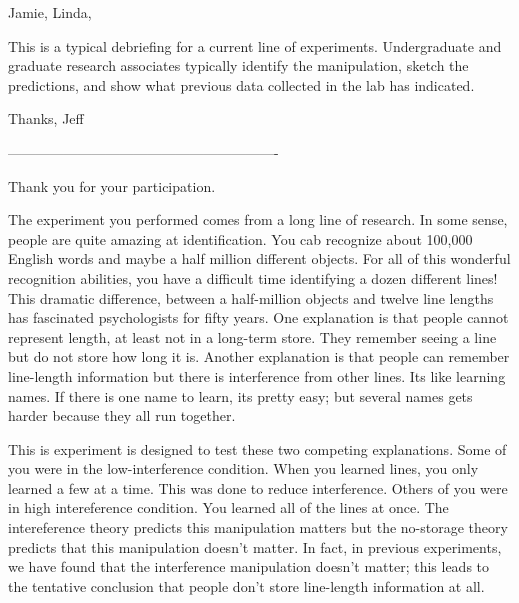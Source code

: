Jamie, Linda,

This is a typical debriefing for a current line of experiments.
Undergraduate and graduate research associates typically identify the
manipulation, sketch the predictions, and show what previous data
collected in the lab has indicated.  

Thanks,
Jeff

----------------------------------------------------------


Thank you for your participation.  

The experiment you performed comes from a long line of research.  In
some sense, people are quite amazing at identification.  You cab
recognize about 100,000 English words and maybe a half million
different objects.  For all of this wonderful recognition abilities,
you have a difficult time identifying a dozen different lines!  This
dramatic difference, between a half-million objects and twelve line
lengths has fascinated psychologists for fifty years.  One explanation
is that people cannot represent length, at least not in a long-term
store.  They remember seeing a line but do not store how long it is.
Another explanation is that people can remember line-length
information but there is interference from other lines.  Its like
learning names.  If there is one name to learn, its pretty easy; but
several names gets harder because they all run together.  

This is experiment is designed to test these two competing
explanations.  Some of you were in the low-interference condition.
When you learned lines, you only learned a few at a time.  This was
done to reduce interference.  Others of you were in high intereference
condition.  You learned all of the lines at once.  The intereference
theory predicts this manipulation matters but the no-storage theory
predicts that this manipulation doesn't matter.  In fact, in previous
experiments, we have found that the interference manipulation doesn't
matter; this leads to the tentative conclusion that people don't store
line-length information at all.



